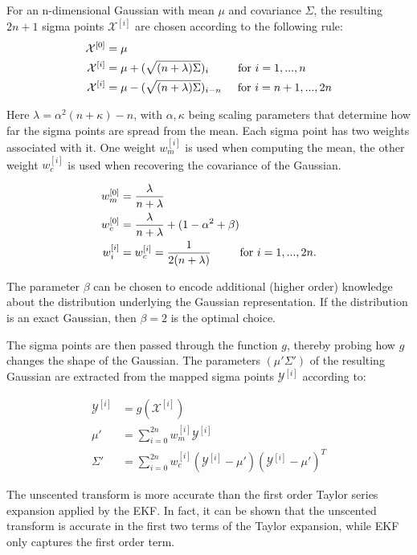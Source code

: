 For an n-dimensional Gaussian with mean $\mu$ and covariance $\Sigma$, the resulting $2n+1$ sigma points $\mathcal{X}^{ [i] }$ are chosen according to the following rule:
\begin{align}
  \mathcal{X}^{ [0] } &= \mu \\
  \mathcal{X}^{ [i] } &= \mu + (\sqrt{(n + \lambda) \Sigma})_{i} \hspace{9mm} \text{for } i=1,...,n \\
  \mathcal{X}^{ [i] } &= \mu - (\sqrt{(n + \lambda) \Sigma})_{i-n} \hspace{5mm} \text{for } i=n+1,...,2n
\end{align}

Here $\lambda = \alpha^2 (n+ \kappa)-n$, with $\alpha, \kappa$ being scaling parameters that determine how far the sigma points are spread from the mean.
Each sigma point has two weights associated with it.
One weight $w_m^{ [i] }$ is used when computing the mean, the other weight $w_c^{ [i] }$ is used when recovering the covariance of the Gaussian.

\begin{align}
  w_m^{ [0] } &= \frac{\lambda}{n+\lambda} \\
  w_c^{ [0] } &= \frac{\lambda}{n+\lambda} + (1 - \alpha^2 + \beta) \\
  w_i^{ [i] } &= w_c^{ [i] } = \frac{1}{2(n+\lambda)} \hspace{9mm} \text{for } i=1,...,2n.
\end{align}

The parameter $\beta$ can be chosen to encode additional (higher order) knowledge about the distribution underlying the Gaussian representation.
If the distribution is an exact Gaussian, then $\beta=2$ is the optimal choice.

The sigma points are then passed through the function $g$, thereby probing how $g$ changes the shape of the Gaussian.
The parameters $(\mu' \Sigma')$ of the resulting Gaussian are extracted from the mapped sigma points $\mathcal{Y}^{ [i] }$ according to:

\begin{align}
  \mathcal{Y}^{ [i] } &= g(\mathcal{X}^{ [i] }) \\
  \mu' &= \sum_{i=0}^{2n}{w_m^{ [i] } \mathcal{Y}^{ [i] }} \\
  \Sigma' &= \sum_{i=0}^{2n}{w_c^{ [i] }(\mathcal{Y}^{ [i] } - \mu')(\mathcal{Y}^{ [i] } - \mu')^T}
\end{align}

The unscented transform is more accurate than the first order Taylor series expansion applied by the EKF.
In fact, it can be shown that the unscented transform is accurate in the first two terms of the Taylor expansion, while EKF only captures the first order term.

